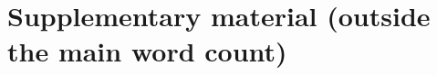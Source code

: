 \section*{Supplementary material (outside the main word count)}\label{sec:supplementary_material_outside_the_main_}

